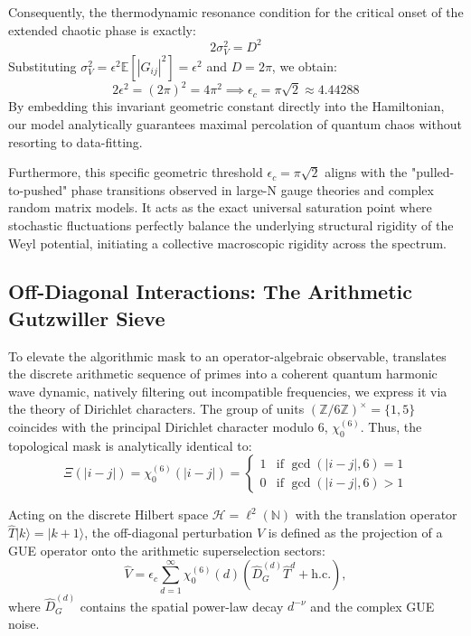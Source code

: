 \documentclass[aps,prl,preprint,superscriptaddress,floatfix]{revtex4-2}
\newcommand{\N}{\mathbb{N}}
\newcommand{\Hilb}{\mathcal{H}}
\newcommand{\Zmod}{\mathbb{Z}/6\mathbb{Z}}
\begin{document}
Consequently, the thermodynamic resonance condition for the critical onset of the extended chaotic phase is exactly:
\begin{equation}
2 \sigma_V^2 = D^2
\end{equation}
Substituting $\sigma_V^2 = \epsilon^2 \mathbb{E}[|G_{ij}|^2] = \epsilon^2$ and $D = 2\pi$, we obtain:
\begin{equation}
2 \epsilon^2 = (2\pi)^2 = 4\pi^2 \implies \boxed{ \epsilon_c = \pi \sqrt{2} \approx 4.44288 }
\end{equation}
By embedding this invariant geometric constant directly into the Hamiltonian, our model analytically guarantees maximal percolation of quantum chaos without resorting to data-fitting.

Furthermore, this specific geometric threshold $\epsilon_c = \pi\sqrt{2}$ aligns with the "pulled-to-pushed" phase transitions observed in large-N gauge theories and complex random matrix models\cite{Gross1980, Cunden2018}. It acts as the exact universal saturation point where stochastic fluctuations perfectly balance the underlying structural rigidity of the Weyl potential, initiating a collective macroscopic rigidity across the spectrum.

\subsection{Off-Diagonal Interactions: The Arithmetic Gutzwiller Sieve}

To elevate the algorithmic mask to an operator-algebraic observable, translates the discrete arithmetic sequence of primes into a coherent quantum harmonic wave dynamic, natively filtering out incompatible frequencies, we express it via the theory of Dirichlet characters. The group of units $(\Zmod)^\times = \{1, 5\}$ coincides with the principal Dirichlet character modulo 6, $\chi_0^{(6)}$. Thus, the topological mask is analytically identical to:
\begin{equation}
\Xi(|i-j|) = \chi_0^{(6)}(|i-j|) = \begin{cases} 
1 & \text{if } \gcd(|i-j|, 6) = 1 \\ 
0 & \text{if } \gcd(|i-j|, 6) > 1 
\end{cases}
\end{equation}

Acting on the discrete Hilbert space $\Hilb = \ell^2(\N)$ with the translation operator $\hat{T}|k\rangle = |k+1\rangle$, the off-diagonal perturbation $\hat{V}$ is defined as the projection of a GUE operator onto the arithmetic superselection sectors:
\begin{equation}
\label{eq:interaction}
\hat{V} = \epsilon_c \sum_{d=1}^{\infty} \chi_0^{(6)}(d) \left( \hat{D}_G^{(d)} \hat{T}^d + \text{h.c.} \right),
\end{equation}
where $\hat{D}_G^{(d)}$ contains the spatial power-law decay $d^{-\nu}$ and the complex GUE noise. 
\end{document}
